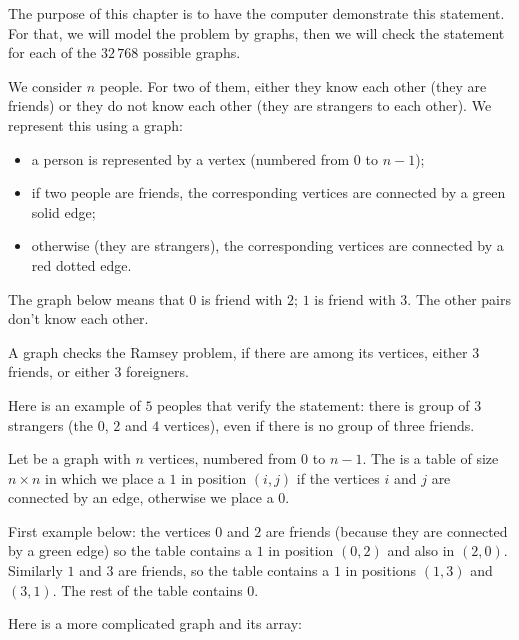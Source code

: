 \documentclass[11pt,class=report,crop=false]{standalone}
\begin{document}
\begin{cours}


The purpose of this chapter is to have the computer demonstrate this statement. For that, we will model the problem by graphs, then we will check the statement for each of the $32\,768$ possible graphs.

\bigskip 

We consider $n$ people. For two of them, either they know each other (they are friends) or they do not know each other (they are strangers to each other). We represent this using a graph:
\begin{itemize}
  \item a person is represented by a vertex (numbered from $0$ to $n-1$);
  \item if two people are friends, the corresponding vertices are connected by a green solid edge;
  \item otherwise (they are strangers), the corresponding vertices are connected by a red dotted edge. 
\end{itemize}

The graph below means that $0$ is friend with $2$; $1$ is friend with $3$. The other pairs don't know each other.

A graph checks the Ramsey problem, if there are among its vertices, either $3$ friends, or either $3$ foreigners.

Here is an example of $5$ peoples that verify the statement: there is group of $3$ strangers (the $0$, $2$ and $4$ vertices), even if there is no group of three friends.

\end{cours}


\begin{cours}[Model]



Let be a graph with $n$ vertices, numbered from $0$ to $n-1$.
The  is a table of size $n \times n$ in which we place a $1$ in position $(i,j)$ if the vertices $i$ and $j$ are connected by an edge, otherwise we place a $0$.

\bigskip
First example below: the vertices $0$ and $2$ are friends (because they are connected by a green edge) so the table contains a $1$ in position $(0,2)$ and also in $(2,0)$. Similarly $1$ and $3$ are friends, so the table contains a $1$ in positions $(1,3)$ and $(3,1)$. The rest of the table contains $0$.


Here is a more complicated graph and its array:

\end{cours}
\end{document}
